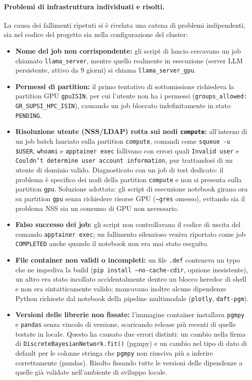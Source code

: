 \paragraph{Problemi di infrastruttura individuati e risolti.}
La causa dei fallimenti ripetuti si \`e rivelata una catena di problemi indipendenti, sia nel codice del progetto sia nella configurazione del cluster:
\begin{itemize}
  \item \textbf{Nome del job non corrispondente:} gli script di lancio cercavano un job chiamato \texttt{llama\_server}, mentre quello realmente in esecuzione (server LLM persistente, attivo da 9 giorni) si chiama \texttt{llama\_server\_gpu}.
  \item \textbf{Permessi di partition:} il primo tentativo di sottomissione richiedeva la partition GPU \texttt{gpuISIN}, per cui l'utente non ha i permessi (\texttt{groups\_allowed: GR\_SUPSI\_HPC\_ISIN}), causando un job bloccato indefinitamente in stato \texttt{PENDING}.
  \item \textbf{Risoluzione utente (NSS/LDAP) rotta sui nodi \texttt{compute}:} all'interno di un job batch lanciato sulla partition \texttt{compute}, comandi come \texttt{squeue -u \$USER}, \texttt{whoami} e \texttt{apptainer exec} fallivano con errori quali \texttt{Invalid user} e \texttt{Couldn't determine user account information}, pur trattandosi di un utente di dominio valido. Diagnosticato con un job di test dedicato: il problema \`e specifico dei nodi della partition \texttt{compute} e non si presenta sulla partition \texttt{gpu}. Soluzione adottata: gli script di esecuzione notebook girano ora su partition \texttt{gpu} senza richiedere risorse GPU (\texttt{--gres} omesso), evitando sia il problema NSS sia un consumo di GPU non necessario.
  \item \textbf{Falso successo dei job:} gli script non controllavano il codice di uscita del comando \texttt{apptainer exec}; un fallimento silenzioso veniva riportato come job \texttt{COMPLETED} anche quando il notebook non era mai stato eseguito.
  \item \textbf{File container non validi o incompleti:} un file \texttt{.def} conteneva un typo che ne impediva la build (\texttt{pip install --no-cache-cdir}, opzione inesistente), un altro era stato incollato accidentalmente dentro un blocco heredoc di shell e non era sintatticamente valido; mancavano inoltre alcune dipendenze Python richieste dal notebook della pipeline multimodale (\texttt{plotly}, \texttt{daft-pgm}).
  \item \textbf{Versioni delle librerie non fissate:} l'immagine container installava \texttt{pgmpy} e \texttt{pandas} senza vincolo di versione, scaricando release pi\`u recenti di quelle testate in locale. Questo ha causato due errori distinti: un cambio nella firma di \texttt{DiscreteBayesianNetwork.fit()} (pgmpy) e un cambio nel tipo di dato di default per le colonne stringa che \texttt{pgmpy} non riusciva pi\`u a inferire correttamente (pandas). Risolto fissando tutte le versioni delle dipendenze a quelle gi\`a validate nell'ambiente di sviluppo locale.
\end{itemize}
